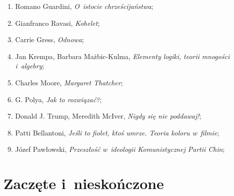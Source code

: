 \documentclass[a4paper,11pt]{article}
\begin{document}
\begin{enumerate}
\item Romano Guardini, \textit{O~istocie chrześcijaństwa};

\item Gianfranco Ravasi, \textit{Kohelet};

\item Carrie Gress, \textit{Odnowa};

\item Jan Krempa, Barbara Mażbic-Kulma, \textit{Elementy logiki, teorii
    mnogości i~algebry};

\item Charles Moore, \textit{Margaret Thatcher};

\item G. Polya, \textit{Jak to rozwiązać?};

\item Donald J. Trump, Meredith McIver, \textit{Nigdy się nie poddawaj!};

\item Patti Bellantoni, \textit{Jeśli to fiolet, ktoś umrze. Teoria koloru
    w~filmie};

\item Józef Pawłowski, \textit{Przeszłość w~ideologii Komunistycznej Partii
    Chin};

































\end{enumerate}










\newpage
\section{Zaczęte i~nieskończone}

\vspace{\spaceTwo}
\end{document}
